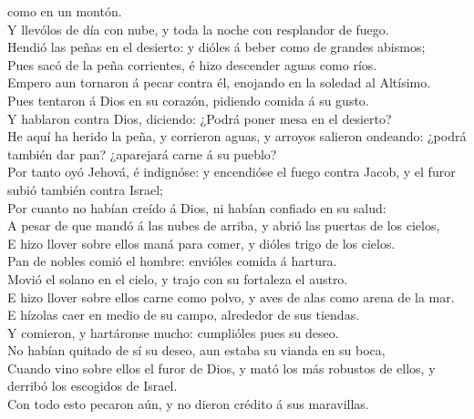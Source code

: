 como en un montón.\\
 Y llevólos de día con nube, y toda la noche con
resplandor de fuego.\\
 Hendió las peñas en el desierto: y dióles á beber como
de grandes abismos;\\
 Pues sacó de la peña corrientes, é hizo descender aguas
como ríos.\\
 Empero aun tornaron á pecar contra él, enojando en la
soledad al Altísimo.\\
 Pues tentaron á Dios en su corazón, pidiendo comida á su
gusto.\\
 Y hablaron contra Dios, diciendo: ¿Podrá poner mesa en
el desierto?\\
 He aquí ha herido la peña, y corrieron aguas, y arroyos
salieron ondeando: ¿podrá también dar pan? ¿aparejará carne á su
pueblo?\\
 Por tanto oyó Jehová, é indignóse: y encendióse el fuego
contra Jacob, y el furor subió también contra Israel;\\
 Por cuanto no habían creído á Dios, ni habían confiado
en su salud:\\
 A pesar de que mandó á las nubes de arriba, y abrió las
puertas de los cielos,\\
 E hizo llover sobre ellos maná para comer, y dióles
trigo de los cielos.\\
 Pan de nobles comió el hombre: envióles comida á
hartura.\\
 Movió el solano en el cielo, y trajo con su fortaleza el
austro.\\
 E hizo llover sobre ellos carne como polvo, y aves de
alas como arena de la mar.\\
 E hízolas caer en medio de su campo, alrededor de sus
tiendas.\\
 Y comieron, y hartáronse mucho: cumplióles pues su
deseo.\\
 No habían quitado de sí su deseo, aun estaba su vianda
en su boca,\\
 Cuando vino sobre ellos el furor de Dios, y mató los más
robustos de ellos, y derribó los escogidos de Israel.\\
 Con todo esto pecaron aún, y no dieron crédito á sus
maravillas.\\
